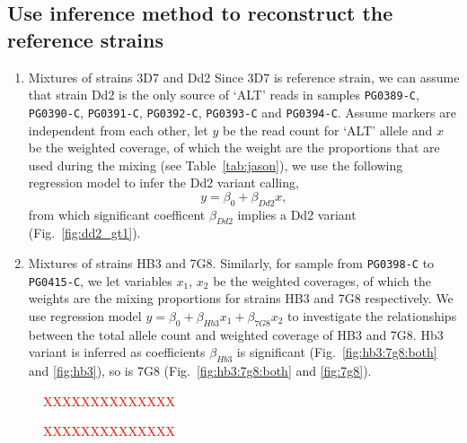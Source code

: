 \subsection{Use inference method to reconstruct the reference strains}
\begin{enumerate}
\item Mixtures of strains 3D7 and Dd2
Since 3D7 is reference strain, we can assume that strain Dd2 is the only source of `ALT' reads in samples {\tt PG0389-C}, {\tt PG0390-C}, {\tt PG0391-C}, {\tt PG0392-C}, {\tt PG0393-C} and {\tt PG0394-C}. Assume markers are independent from each other, let $y$ be the read count for `ALT' allele and $x$ be the weighted coverage, of which the weight are the proportions that are used during the mixing (see Table~\ref{tab:jason}), we use the following regression model to infer the Dd2 variant calling, $$y = \beta_0 + \beta_{Dd2} x,$$
from which significant coefficent $\beta_{Dd2}$ implies a Dd2 variant (Fig.~\ref{fig:dd2_gt1}).

\item Mixtures of strains HB3 and 7G8.
Similarly, for sample from {\tt PG0398-C} to {\tt PG0415-C},  we let variables $x_1$, $x_2$ be the weighted coverages, of which the weights are the mixing proportions for strains HB3 and 7G8 respectively. We use regression model $y = \beta_0 + \beta_{Hb3} x_1 + \beta_{7G8} x_2$ to investigate the relationships between the total allele count and weighted coverage of HB3 and 7G8. Hb3 variant is inferred as coefficients $\beta_{Hb3}$ is significant (Fig.~\ref{fig:hb3:7g8:both} and \ref{fig:hb3}), so is 7G8 (Fig.~\ref{fig:hb3:7g8:both} and \ref{fig:7g8}).
\end{enumerate}



\begin{figure}[h]
\caption{\textcolor{red}{XXXXXXXXXXXXXX}}
\end{figure}


\begin{figure}[h]
\caption{\textcolor{red}{XXXXXXXXXXXXXX}}
\end{figure}


